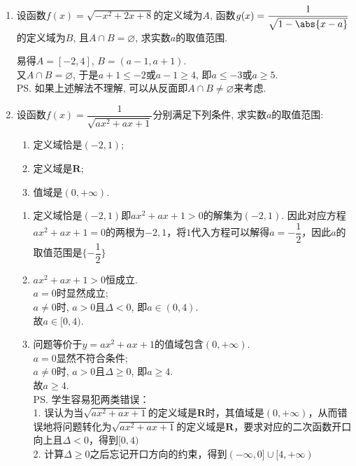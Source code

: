 \begin{enumerate}
\item 设函数$f(x)=\sqrt{-x^2+2x+8}$的定义域为$A$, 函数$g(x)=\dfrac{1}{\sqrt{1-\abs{x-a}}}$的定义域为$B$, 
且$A\cap B=\varnothing$, 求实数$a$的取值范围. 
\begin{jieda}
易得$A=[-2,4]$, $B=(a-1,a+1)$. \\
又$A\cap B=\varnothing$, 于是$a+1\leq-2$或$a-1\geq 4$, 即$a\leq-3$或$a\geq 5$. \\
\ps 如果上述解法不理解, 可以从反面即$A\cap B\neq\varnothing$来考虑. 
\end{jieda}
\begin{vspace_}
\vsp[7]
\end{vspace_}

\item 设函数$f(x)=\dfrac{1}{\sqrt{ax^2+ax+1}}$分别满足下列条件, 求实数$a$的取值范围: 
\begin{enumerate}
\item 定义域恰是$(-2,1)$; 
\item 定义域是$\mathbf{R}$; 
\item 值域是$(0,+\infty)$. 
\end{enumerate}
\begin{jieda}
\begin{enumerate}
    \item 定义域恰是$(-2,1)$即$ax^2+ax+1>0$的解集为$(-2,1)$. 因此对应方程$ax^2+ax+1=0$的两根为$-2, 1$，将$1$代入方程可以解得$a = -\dfrac{1}{2}$，因此$a$的取值范围是$\{-\dfrac{1}{2}\}$
    
    \item $ax^2+ax+1>0$恒成立. \\
    $a=0$时显然成立; \\
    $a\neq 0$时, $a>0$且$ \Delta<0$, 即$a\in(0,4)$. \\
    故$a\in[0,4)$. 
    
    \item 问题等价于$y=ax^2+ax+1$的值域包含$(0,+\infty)$. \\
    $a=0$显然不符合条件; \\
    $a\neq 0$时, $a>0$且$\Delta\geq0$, 即$a\geq 4$. \\
    故$a\geq 4$. \\
    \ps 学生容易犯两类错误：\\
        1. 误认为当$\sqrt{ax^2+ax+1}$的定义域是$\mathbf{R}$时，其值域是$(0, +\infty)$，从而错误地将问题转化为$\sqrt{ax^2+ax+1}$的定义域是$\mathbf{R}$，要求对应的二次函数开口向上且$\Delta < 0$，得到$[0, 4)$\\
        2. 计算$\Delta \geq 0$之后忘记开口方向的约束，得到$(-\infty, 0] \cup [4, +\infty)$
\end{enumerate}
\end{jieda}
\begin{vspace_}
\vsp[5]
\end{vspace_}


\end{enumerate}
